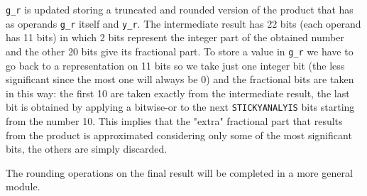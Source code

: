 \documentclass[paper=letter, fontsize=12pt]{article}
\begin{document}
\texttt{g\_r} is updated storing a truncated and rounded version of the product that has as operands \texttt{g\_r} itself and \texttt{y\_r}. The intermediate result has 22 bits (each operand has 11 bits) in which 2 bits represent the integer part of the obtained number and the other 20 bits give its fractional part. To store a value in \texttt{g\_r} we have to go back to a representation on 11 bits so we take just one integer bit (the less significant since the most one will always be 0) and the fractional bits are taken in this way: the first 10 are taken exactly from the intermediate result, the last bit is obtained by applying a bitwise-or to the next \texttt{STICKYANALYIS} bits starting from the number 10. This implies that the "extra" fractional part that results from the product is approximated considering only some of the most significant bits, the others are simply discarded.

The rounding operations on the final result will be completed in a more general module.
\end{document}
